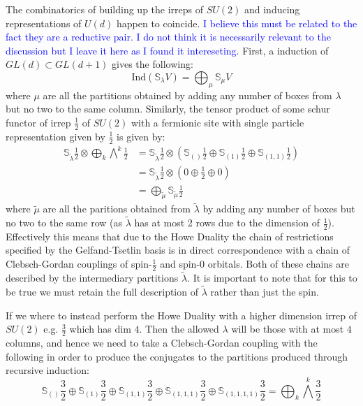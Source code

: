 \documentclass[aps,prx,twocolumn,floatfix,10pt,amssymb,amsfont,amsmath,superscriptaddress,float,nofootinbib,longbibliography,nobalancelastpage]{revtex4-2}
\begin{document}
The combinatorics of building up the irreps of $SU(2)$ and inducing representations of $U(d)$ happen to coincide. \textcolor{blue}{I believe this must be related to the fact they are a reductive pair. I do not think it is necessarily relevant to the discussion but I leave it here as I found it intereseting.} First, a induction of $GL(d) \subset GL(d+1)$ gives the following:
\begin{equation}
    \text{Ind}(\mathbb{S}_{\lambda} V) = \bigoplus_{\mu} \mathbb{S}_{\mu} V
\end{equation}
where $\mu$ are all the partitions obtained by adding any number of boxes from $\lambda$ but no two to the same column. Similarly, the tensor product of some schur functor of irrep $\frac{1}{2}$ of $SU(2)$ with a fermionic site with single particle representation given by $\frac{1}{2}$ is given by:
\begin{align}
    \mathbb{S}_{\tilde \lambda}\frac{1}{2} \otimes \bigoplus_k\bigwedge^k \frac{1}{2} &= \mathbb{S}_{\tilde \lambda}\frac{1}{2} \otimes (\mathbb{S}_{()}\frac{1}{2} \oplus \mathbb{S}_{(1)}\frac{1}{2} \oplus \mathbb{S}_{(1,1)}\frac{1}{2})\\
    &= \mathbb{S}_{\tilde \lambda}\frac{1}{2} \otimes (0 \oplus \frac{1}{2} \oplus 0)\\
    &= \bigoplus_{\tilde \mu} \mathbb{S}_{\tilde \mu} \frac{1}{2}
\end{align}
where $\tilde \mu$ are all the paritions obtained from $\tilde \lambda$ by adding any number of boxes but no two to the same row (as $\tilde \lambda$ has at most 2 rows due to the dimension of $\frac{1}{2}$). Effectively this means that due to the Howe Duality the chain of restrictions specified by the Gelfand-Tsetlin basis is in direct correspondence with a chain of Clebsch-Gordan couplings of spin-$\frac{1}{2}$ and spin-$0$ orbitals. Both of these chains are described by the intermediary partitions $\tilde \lambda$. It is important to note that for this to be true we must retain the full description of $\tilde \lambda$ rather than just the spin. 

If we where to instead perform the Howe Duality with a higher dimension irrep of $SU(2)$ e.g. $\frac{3}{2}$ which has dim $4$. Then the allowed $\lambda$ will be those with at most $4$ columns, and hence we need to take a Clebsch-Gordan coupling with the following in order to produce the conjugates to the partitions produced through recursive induction:
\begin{equation}
    \mathbb{S}_{()}\frac{3}{2} \oplus\mathbb{S}_{(1)}\frac{3}{2} \oplus\mathbb{S}_{(1,1)}\frac{3}{2} \oplus\mathbb{S}_{(1,1,1)}\frac{3}{2} \oplus\mathbb{S}_{(1,1,1,1)}\frac{3}{2} = \bigoplus_k \bigwedge^k \frac{3}{2}
\end{equation}
\end{document}

